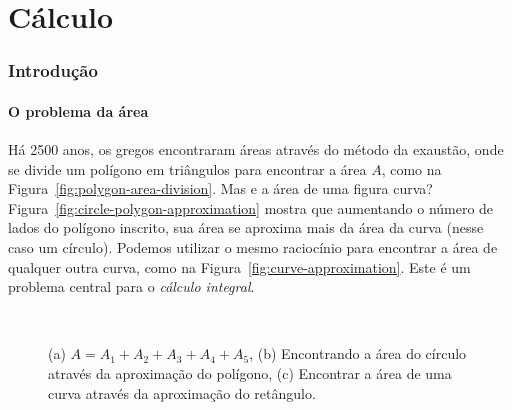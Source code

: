 \part{Cálculo}
\section{Introdução}

\subsection{O problema da área}
Há 2500 anos, os gregos encontraram áreas através do método da exaustão, onde se divide um polígono em triângulos para encontrar a área $A$, como na Figura~\ref{fig:polygon-area-division}. Mas e a área de uma figura curva?  Figura~\ref{fig:circle-polygon-approximation} mostra que aumentando o número de lados do polígono inscrito, sua área se aproxima mais da área da curva (nesse caso um círculo). Podemos utilizar o mesmo raciocínio para encontrar a área de qualquer outra curva, como na Figura~\ref{fig:curve-approximation}. Este é um problema central para o \emph{cálculo integral}.\vspace{-0.6cm}
\begin{figure}[!ht]
  \\
  
  \caption{(a) $A = A_1+A_2+A_3+A_4+A_5$, (b) Encontrando a área do círculo através da aproximação do polígono, (c) Encontrar a área de uma curva através da aproximação do retângulo.}
\end{figure}

